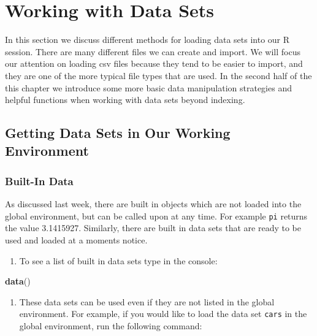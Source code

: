 \documentclass[
]{book}
\newenvironment{Shaded}{\begin{snugshade}}{\end{snugshade}}
\newcommand{\KeywordTok}[1]{\textcolor[rgb]{0.13,0.29,0.53}{\textbf{#1}}}
\newcommand{\NormalTok}[1]{#1}
\providecommand{\tightlist}{%
  \setlength{\itemsep}{0pt}\setlength{\parskip}{0pt}}
\begin{document}
\hypertarget{working-with-data-sets}{%
\chapter{Working with Data Sets}\label{working-with-data-sets}}

In this section we discuss different methods for loading data sets into our R session. There are many different files we can create and import. We will focus our attention on loading csv files because they tend to be easier to import, and they are one of the more typical file types that are used. In the second half of the this chapter we introduce some more basic data manipulation strategies and helpful functions when working with data sets beyond indexing.

\hypertarget{LoadData}{%
\section{Getting Data Sets in Our Working Environment}\label{LoadData}}

\hypertarget{built-in-data}{%
\subsection*{Built-In Data}\label{built-in-data}}

As discussed last week, there are built in objects which are not loaded into the global environment, but can be called upon at any time. For example \texttt{pi} returns the value 3.1415927. Similarly, there are built in data sets that are ready to be used and loaded at a moments notice.

\begin{enumerate}
\def\labelenumi{\arabic{enumi})}
\tightlist
\item
  To see a list of built in data sets type in the console:
\end{enumerate}

\begin{Shaded}
\begin{Highlighting}[]
\KeywordTok{data}\NormalTok{()}
\end{Highlighting}
\end{Shaded}

\begin{enumerate}
\def\labelenumi{\arabic{enumi})}
\setcounter{enumi}{1}
\tightlist
\item
  These data sets can be used even if they are not listed in the global environment. For example, if you would like to load the data set \texttt{cars} in the global environment, run the following command:
\end{enumerate}
\end{document}
